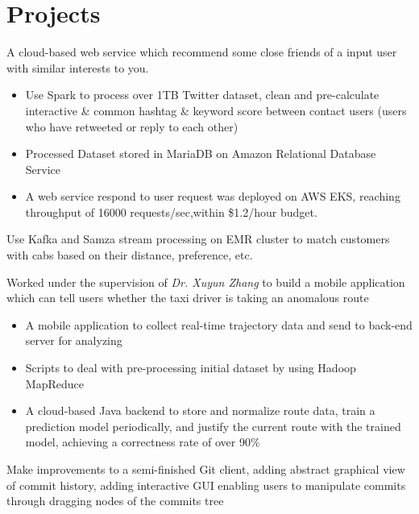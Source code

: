 \documentclass{resume}
\begin{document}
\section{Projects}
\begin{flushleft}

A cloud-based web service which recommend some close friends of a input user with similar interests to you.
\begin{itemize}
    \item Use Spark to process over 1TB Twitter dataset, clean and pre-calculate interactive \& common hashtag \linebreak \& keyword score between contact users (users who have retweeted or reply to each other)
    \item Processed Dataset stored in MariaDB on Amazon Relational Database Service
    \item A web service respond to user request was deployed on AWS EKS, reaching throughput of 16000 requests/sec,\linebreak within \$1.2/hour budget.
\end{itemize}

Use Kafka and Samza stream processing on EMR cluster to match customers with cabs based on their distance, preference, etc.

Worked under the supervision of \textit{Dr. Xuyun Zhang} to build a mobile application which can tell users whether \linebreak the taxi driver is taking an anomalous route
\begin{itemize}
    \item A mobile application to collect real-time trajectory data and send to back-end server for analyzing
    \item Scripts to deal with pre-processing initial dataset by using Hadoop MapReduce
    \item A cloud-based Java backend to store and normalize route data, train a prediction model periodically, \linebreak and justify the current route with the trained model, achieving a correctness rate of over 90\%
\end{itemize}

Make improvements to a semi-finished Git client, adding abstract graphical view of commit history, \linebreak adding interactive GUI enabling users to manipulate commits through dragging nodes of the commits tree
\end{flushleft}
\end{document}
